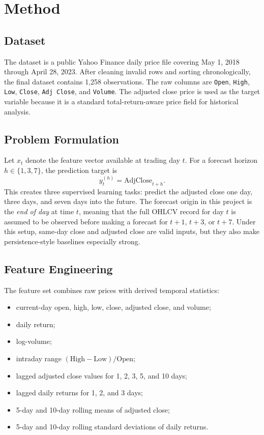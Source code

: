 \documentclass[conference]{IEEEtran}
\begin{document}
\section{Method}
\subsection{Dataset}
The dataset is a public Yahoo Finance daily price file covering May 1, 2018 through April 28, 2023. After cleaning invalid rows and sorting chronologically, the final dataset contains 1,258 observations. The raw columns are \texttt{Open}, \texttt{High}, \texttt{Low}, \texttt{Close}, \texttt{Adj Close}, and \texttt{Volume}. The adjusted close price is used as the target variable because it is a standard total-return-aware price field for historical analysis.

\subsection{Problem Formulation}
Let $x_t$ denote the feature vector available at trading day $t$. For a forecast horizon $h \in \{1, 3, 7\}$, the prediction target is
\[
y_t^{(h)} = \text{AdjClose}_{t+h}.
\]
This creates three supervised learning tasks: predict the adjusted close one day, three days, and seven days into the future. The forecast origin in this project is the \emph{end of day} at time $t$, meaning that the full OHLCV record for day $t$ is assumed to be observed before making a forecast for $t+1$, $t+3$, or $t+7$. Under this setup, same-day close and adjusted close are valid inputs, but they also make persistence-style baselines especially strong.

\subsection{Feature Engineering}
The feature set combines raw prices with derived temporal statistics:
\begin{itemize}
    \item current-day open, high, low, close, adjusted close, and volume;
    \item daily return;
    \item log-volume;
    \item intraday range $(\text{High} - \text{Low}) / \text{Open}$;
    \item lagged adjusted close values for 1, 2, 3, 5, and 10 days;
    \item lagged daily returns for 1, 2, and 3 days;
    \item 5-day and 10-day rolling means of adjusted close;
    \item 5-day and 10-day rolling standard deviations of daily returns.
\end{itemize}
\end{document}
